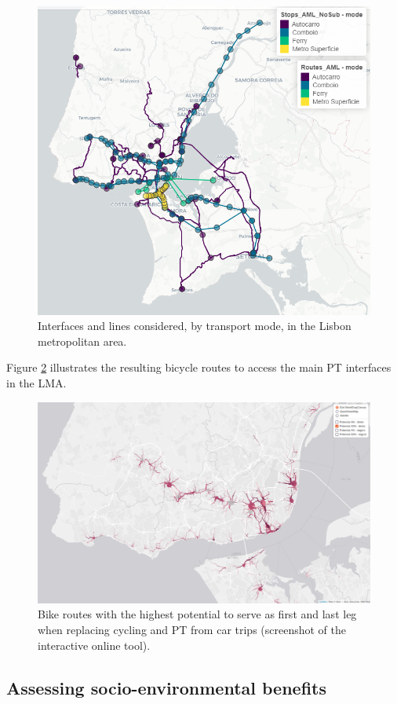 \documentclass[review, doubleblind, 3p,
authoryear]{elsarticle} %
\begin{document}
\begin{figure}

{\centering \includegraphics[width=0.6\linewidth,]{img/map1} 

}

\caption{Interfaces and lines considered, by transport mode, in the Lisbon metropolitan area.}\label{fig:map1}
\end{figure}

Figure \ref{fig:map2} illustrates the resulting bicycle routes to access
the main PT interfaces in the LMA.

\begin{figure}

{\centering \includegraphics[width=0.8\linewidth,]{img/map2} 

}

\caption{Bike routes with the highest potential to serve as first and last leg when replacing cycling and PT from car trips (screenshot of the interactive online tool).}\label{fig:map2}
\end{figure}

\hypertarget{assessing-socio-environmental-benefits}{%
\subsection{Assessing socio-environmental
benefits}\label{assessing-socio-environmental-benefits}}
\end{document}
